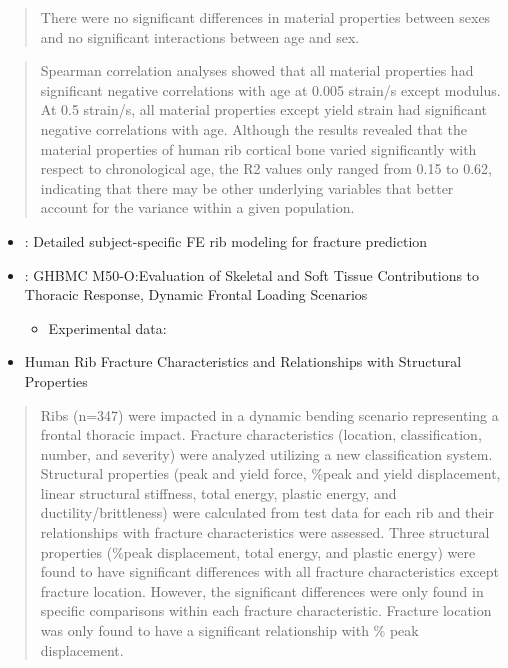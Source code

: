 \documentclass[]{book}
\providecommand{\tightlist}{%
  \setlength{\itemsep}{0pt}\setlength{\parskip}{0pt}}
\begin{document}
\begin{quote}
There were no significant differences in material properties between sexes and no significant interactions between age and sex.
\end{quote}

\begin{quote}
Spearman correlation analyses showed that all material properties had significant negative correlations with age at 0.005 strain/s except modulus. At 0.5 strain/s, all material properties except yield strain had significant negative correlations with age. Although the results revealed that the material properties of human rib cortical bone varied significantly with respect to chronological age, the R2 values only ranged from 0.15 to 0.62, indicating that there may be other underlying variables that better account for the variance within a given population.
\end{quote}

\begin{itemize}
\item
  \citet{Iraeus2019}: Detailed subject-specific FE rib modeling for fracture prediction
\item
  \citet{Ramachandra2019}: GHBMC M50-O:Evaluation of Skeletal and Soft Tissue Contributions to Thoracic Response, Dynamic Frontal Loading Scenarios

  \begin{itemize}
  \tightlist
  \item
    Experimental data: \citep{Murach2018}
  \end{itemize}
\item
  Human Rib Fracture Characteristics and Relationships with Structural Properties \citep{Harden2019}
\end{itemize}

\begin{quote}
Ribs (n=347) were impacted in a dynamic bending scenario representing a frontal thoracic impact. Fracture characteristics (location, classification, number, and severity) were analyzed utilizing a new classification system.
Structural properties (peak and yield force, \%peak and yield displacement, linear structural stiffness, total energy, plastic energy, and ductility/brittleness) were calculated from test data for each rib and their relationships with fracture characteristics were assessed. Three structural properties (\%peak displacement, total energy, and plastic energy) were found to have significant differences with all fracture characteristics except fracture location. However, the significant differences were only found in specific comparisons within each fracture characteristic. Fracture location was only found to have a significant relationship with \% peak displacement.
\end{quote}
\end{document}

